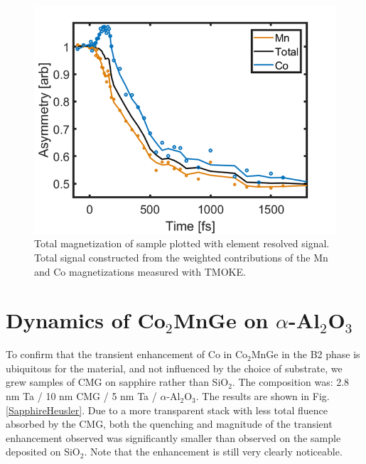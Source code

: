 \begin{figure}[htbp]
	\begin{center}
		\includegraphics[width=120mm]{figs/ElementAveMOKE}
	\end{center}
	\caption{Total magnetization of sample plotted with element resolved signal. Total signal constructed from the weighted contributions of the Mn and Co magnetizations measured with TMOKE.}
	\label{fig: ElementAveMOKE}
\end{figure}

\section{Dynamics of Co$_2$MnGe on $\alpha$-Al$_2$O$_3$}

To confirm that the transient enhancement of Co in Co$_2$MnGe in the B2 phase is ubiquitous for the material, and not influenced by the choice of substrate, we grew samples of CMG on sapphire rather than SiO$_2$. The composition was: 2.8 nm Ta / 10 nm CMG / 5 nm Ta / $\alpha$-Al$_2$O$_3$. The results are shown in Fig. \ref{SapphireHeusler}. Due to a more transparent stack with less total fluence absorbed by the CMG, both the quenching and magnitude of the transient enhancement observed was significantly smaller than observed on the sample deposited on SiO$_2$. Note that the enhancement is still very clearly noticeable.


